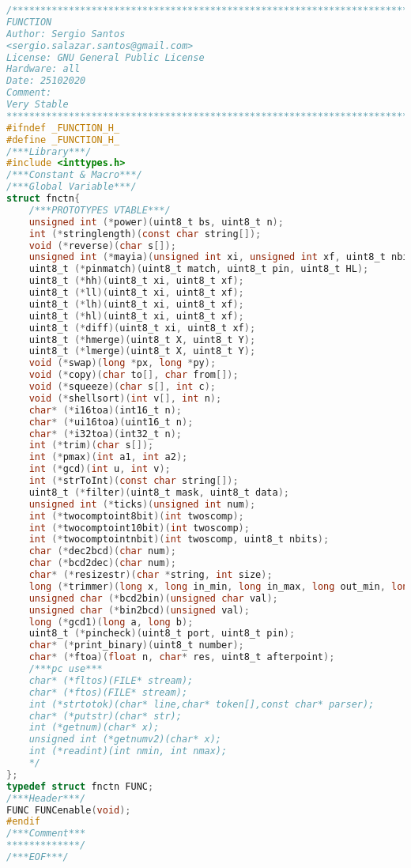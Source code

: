 \begin{lstlisting}[language=C, caption={function.h}, label=function-h, captionpos=b]
/************************************************************************
FUNCTION
Author: Sergio Santos
<sergio.salazar.santos@gmail.com>
License: GNU General Public License
Hardware: all
Date: 25102020
Comment:
Very Stable
************************************************************************/
#ifndef _FUNCTION_H_
#define _FUNCTION_H_
/***Library***/
#include <inttypes.h>
/***Constant & Macro***/
/***Global Variable***/
struct fnctn{
	/***PROTOTYPES VTABLE***/
	unsigned int (*power)(uint8_t bs, uint8_t n);
	int (*stringlength)(const char string[]);
	void (*reverse)(char s[]);
	unsigned int (*mayia)(unsigned int xi, unsigned int xf, uint8_t nbits);
	uint8_t (*pinmatch)(uint8_t match, uint8_t pin, uint8_t HL);
	uint8_t (*hh)(uint8_t xi, uint8_t xf);
	uint8_t (*ll)(uint8_t xi, uint8_t xf);
	uint8_t (*lh)(uint8_t xi, uint8_t xf);
	uint8_t (*hl)(uint8_t xi, uint8_t xf);
	uint8_t (*diff)(uint8_t xi, uint8_t xf);
	uint8_t (*hmerge)(uint8_t X, uint8_t Y);
	uint8_t (*lmerge)(uint8_t X, uint8_t Y);
	void (*swap)(long *px, long *py);
	void (*copy)(char to[], char from[]);
	void (*squeeze)(char s[], int c);
	void (*shellsort)(int v[], int n);
	char* (*i16toa)(int16_t n);
	char* (*ui16toa)(uint16_t n);
	char* (*i32toa)(int32_t n);
	int (*trim)(char s[]);
	int (*pmax)(int a1, int a2);
	int (*gcd)(int u, int v);
	int (*strToInt)(const char string[]);
	uint8_t (*filter)(uint8_t mask, uint8_t data);
	unsigned int (*ticks)(unsigned int num);
	int (*twocomptoint8bit)(int twoscomp);
	int (*twocomptoint10bit)(int twoscomp);
	int (*twocomptointnbit)(int twoscomp, uint8_t nbits);
	char (*dec2bcd)(char num);
	char (*bcd2dec)(char num);
	char* (*resizestr)(char *string, int size);
	long (*trimmer)(long x, long in_min, long in_max, long out_min, long out_max);
	unsigned char (*bcd2bin)(unsigned char val);
	unsigned char (*bin2bcd)(unsigned val);
	long (*gcd1)(long a, long b);
	uint8_t (*pincheck)(uint8_t port, uint8_t pin);
	char* (*print_binary)(uint8_t number);
	char* (*ftoa)(float n, char* res, uint8_t afterpoint);
	/***pc use***
	char* (*fltos)(FILE* stream);
	char* (*ftos)(FILE* stream);
	int (*strtotok)(char* line,char* token[],const char* parser);
	char* (*putstr)(char* str);
	int (*getnum)(char* x);
	unsigned int (*getnumv2)(char* x);
	int (*readint)(int nmin, int nmax);
	*/
};
typedef struct fnctn FUNC;
/***Header***/
FUNC FUNCenable(void);
#endif
/***Comment***
*************/
/***EOF***/
\end{lstlisting}
